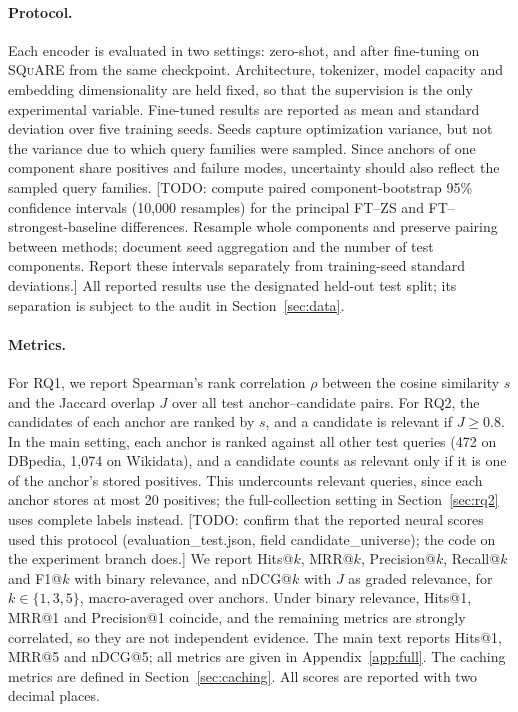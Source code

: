 \documentclass[runningheads]{llncs}
\newcommand{\squareds}{\textsc{SQuARE}}
\newcommand{\hp}[1]{{\color{red!75!black}#1}}
\begin{document}
\paragraph{Protocol.}
Each encoder is evaluated in two settings: zero-shot, and after fine-tuning
on \squareds{} from the same checkpoint. Architecture, tokenizer, model
capacity and embedding dimensionality are held fixed, so that the supervision
is the only experimental variable. Fine-tuned results are reported as mean and
standard deviation over five training seeds. Seeds capture optimization
variance, but not the variance due to which query families were sampled.
Since anchors of one component share positives and failure modes,
uncertainty should also reflect the sampled query families.
\hp{[TODO: compute paired component-bootstrap 95\% confidence intervals
(10,000 resamples) for the principal FT--ZS and FT--strongest-baseline
differences. Resample whole components and preserve pairing between methods;
document seed aggregation and the number of test components. Report these
intervals separately from training-seed standard deviations.]}
All reported results use the designated held-out test split; its separation
is subject to the audit in Section~\ref{sec:data}.

\paragraph{Metrics.}
For RQ1, we report Spearman's rank correlation $\rho$ between the cosine
similarity $s$ and the Jaccard overlap $J$ over all test anchor--candidate
pairs. For RQ2, the candidates of each anchor are ranked by $s$, and a
candidate is relevant if $J \geq 0.8$. In the main setting, each anchor is ranked against
all other test queries (472 on DBpedia, 1{,}074 on Wikidata), and a candidate
counts as relevant only if it is one of the anchor's stored positives. This
undercounts relevant queries, since each anchor stores at most 20 positives;
the full-collection setting in Section~\ref{sec:rq2} uses complete labels
instead. \hp{[TODO: confirm that the reported neural scores used this
protocol (evaluation\_test.json, field candidate\_universe); the code on the
experiment branch does.]} We report Hits@$k$, MRR@$k$,
Precision@$k$, Recall@$k$ and F1@$k$ with binary relevance, and nDCG@$k$ with
$J$ as graded relevance, for $k \in \{1,3,5\}$, macro-averaged over anchors.
Under binary relevance, Hits@1, MRR@1 and Precision@1 coincide, and the
remaining metrics are strongly correlated, so they are not independent
evidence. The main text reports Hits@1, MRR@5 and nDCG@5; all metrics are given in
Appendix~\ref{app:full}. The caching metrics are defined in
Section~\ref{sec:caching}. All scores are reported with two decimal places.
\end{document}
